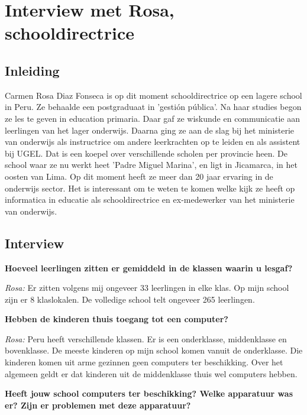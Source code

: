 
\chapter{Interview met Rosa, schooldirectrice}
\label{ch:interviewMetRosa}

\section{Inleiding}
Carmen Rosa Diaz Fonseca is op dit moment schooldirectrice op een lagere school in Peru. Ze behaalde een postgraduaat in 'gestión pública'. Na haar studies begon ze les te geven in education primaria. Daar gaf ze wiskunde en communicatie aan leerlingen van het lager onderwijs. Daarna ging ze aan de slag bij het ministerie van onderwijs als instructrice om andere leerkrachten op te leiden en als assistent bij UGEL. Dat is een koepel over verschillende scholen per provincie heen. De school waar ze nu werkt heet 'Padre Miguel Marina', en ligt in Jicamarca, in het oosten van Lima. Op dit moment heeft ze meer dan 20 jaar ervaring in de onderwijs sector. Het is interessant om te weten te komen welke kijk ze heeft op informatica in educatie als schooldirectrice en ex-medewerker van het ministerie van onderwijs.

\section{Interview}

\textbf{Hoeveel leerlingen zitten er gemiddeld in de klassen waarin u lesgaf?}

\textit{Rosa:} Er zitten volgens mij ongeveer 33 leerlingen in elke klas. Op mijn school zijn er 8 klaslokalen. De volledige school telt ongeveer 265 leerlingen.

\textbf{Hebben de kinderen thuis toegang tot een computer?}

\textit{Rosa:} Peru heeft verschillende klassen. Er is een onderklasse, middenklasse en bovenklasse. De meeste kinderen op mijn school komen vanuit de onderklasse. Die kinderen komen uit arme gezinnen geen computers ter beschikking. Over het algemeen geldt er dat kinderen uit de middenklasse thuis wel computers hebben.

\textbf{Heeft jouw school computers ter beschikking? Welke apparatuur was er? Zijn er problemen met deze apparatuur?}

